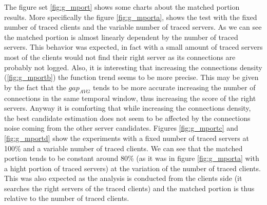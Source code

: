 The figure set \ref{fig:g_mport} shows some charts about the matched
portion results. More specifically the figure \ref{fig:g_mporta}, shows
the test with the fixed number of traced clients and the variable number
of traced servers. As we can see the matched portion is almost linearly 
dependent by the number of traced servers.
This behavior was expected, in fact with a small amount of traced
servers most of the clients would not find their right server as its
connections are probably not logged. Also, it is interesting that
increasing the connections density (\ref{fig:g_mportb}) the function
trend seems to be more precise. This may be given by the fact that the
$gap_{AVG}$ tends to be more accurate increasing the number of
connections in the same temporal window, thus increasing the score of
the right
servers. Anyway it is comforting that while increasing the
connections density, the best candidate estimation does not seem to be affected by the 
 connections noise coming from the other server candidates.
Figures \ref{fig:g_mportc} and \ref{fig:g_mportd} show the experiments
with a fixed number of traced servers at 100\% and a variable number of
traced clients. We can see
that the matched portion tends to be constant around 80\% (as it was in
figure \ref{fig:g_mporta} with a hight portion of traced servers) at the variation of
the number of traced clients. This was also expected as the analysis is
conducted from the clients side (it searches the right servers of the
traced clients) and the matched portion is thus relative to the
number of traced clients. 

